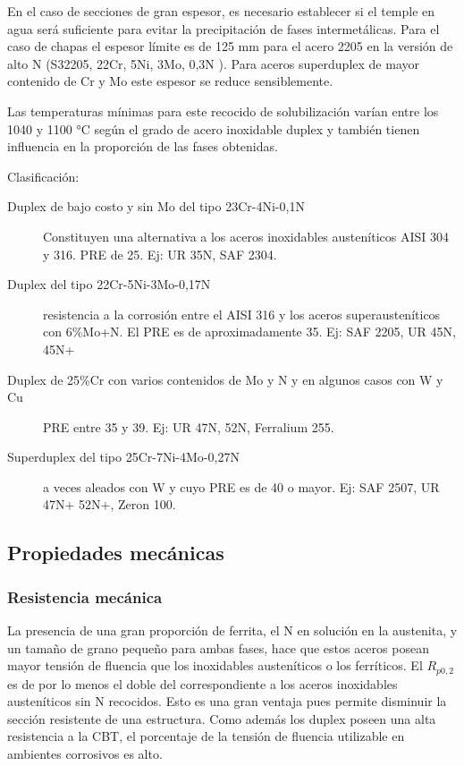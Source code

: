 En el caso de secciones de gran espesor, es necesario establecer si el temple en agua será suficiente para evitar la precipitación de fases intermetálicas. Para el caso de chapas el espesor límite es de 125 mm para el acero 2205 en la versión de alto N (S32205, 22Cr, 5Ni, 3Mo, 0,3N ). Para aceros superduplex de mayor contenido de Cr y Mo este espesor se reduce sensiblemente.


Las temperaturas mínimas para este recocido de solubilización varían entre los 1040 y 1100 °C según el grado de acero inoxidable duplex y también tienen influencia en la proporción de las fases obtenidas.

Clasificación:

\begin{description}
	\item[Duplex de bajo costo y sin Mo del tipo 23Cr-4Ni-0,1N]  Constituyen una alternativa a los aceros inoxidables austeníticos AISI 304 y 316. PRE de 25. Ej: UR 35N, SAF 2304.
	\item[Duplex del tipo 22Cr-5Ni-3Mo-0,17N] resistencia a la 	corrosión entre el AISI 316 y los aceros superausteníticos con 	6\%Mo+N. El PRE es de aproximadamente 35. Ej: SAF 2205, UR 45N, 45N+
	\item[Duplex de 25\%Cr con varios contenidos de Mo y N y en algunos	casos con W y Cu] PRE entre 35 y 39. Ej: UR 47N, 52N, Ferralium 255.
	\item[Superduplex del tipo 25Cr-7Ni-4Mo-0,27N] a veces aleados con W y cuyo PRE es de 40 o mayor. Ej: SAF 2507, UR 47N+ 52N+, Zeron 100.
\end{description}

\subsection{Propiedades mecánicas}

\subsubsection{Resistencia mecánica}
La presencia de una gran proporción de ferrita, el N en solución en la austenita, y un tamaño de grano pequeño para ambas fases, hace que estos aceros posean mayor tensión de fluencia que los inoxidables austeníticos o los ferríticos. El $R_{p0,2}$ es de por lo menos el doble del correspondiente a los aceros inoxidables austeníticos sin N recocidos. Esto es una gran ventaja pues permite disminuir la sección resistente de una estructura. Como además los duplex poseen una alta resistencia a la CBT, el porcentaje de la tensión de fluencia utilizable en ambientes corrosivos es alto.

